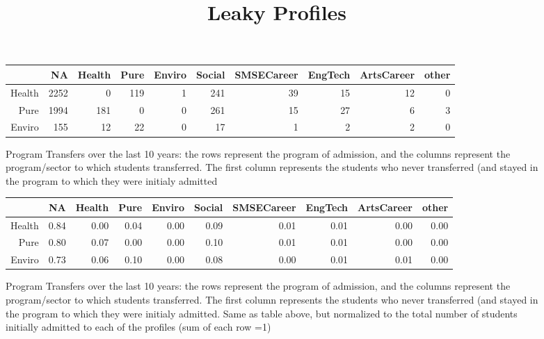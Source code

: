 \documentclass{article}\usepackage[]{graphicx}\usepackage[]{color}
\begin{document}
\title{Leaky Profiles}
\maketitle













\begin{figure}[H]
\centering
\begin{tabular}{rrrrrrrrrr}
  \hline
 & NA & Health & Pure & Enviro & Social & SMSECareer & EngTech & ArtsCareer & other \\ 
  \hline
Health & 2252 &   0 & 119 &   1 & 241 &  39 &  15 &  12 &   0 \\ 
  Pure & 1994 & 181 &   0 &   0 & 261 &  15 &  27 &   6 &   3 \\ 
  Enviro & 155 &  12 &  22 &   0 &  17 &   1 &   2 &   2 &   0 \\ 
   \hline
\end{tabular}
\caption{Program Transfers over the last 10 years: the rows represent the program of admission, and the columns represent the program/sector to which students transferred. The first column represents the students who never transferred (and stayed in the program to which they were initialy admitted} 
\end{figure}
\begin{figure}[H]
\centering
\begin{tabular}{rrrrrrrrrr}
  \hline
 & NA & Health & Pure & Enviro & Social & SMSECareer & EngTech & ArtsCareer & other \\ 
  \hline
Health & 0.84 & 0.00 & 0.04 & 0.00 & 0.09 & 0.01 & 0.01 & 0.00 & 0.00 \\ 
  Pure & 0.80 & 0.07 & 0.00 & 0.00 & 0.10 & 0.01 & 0.01 & 0.00 & 0.00 \\ 
  Enviro & 0.73 & 0.06 & 0.10 & 0.00 & 0.08 & 0.00 & 0.01 & 0.01 & 0.00 \\ 
   \hline
\end{tabular}
\caption{Program Transfers over the last 10 years: the rows represent the program of admission, and the columns represent the program/sector to which students transferred. The first column represents the students who never transferred (and stayed in the program to which they were initialy admitted. Same as table above, but normalized to the total number of students initially admitted to each of the profiles (sum of each row =1)} 
\end{figure}
\end{document}
